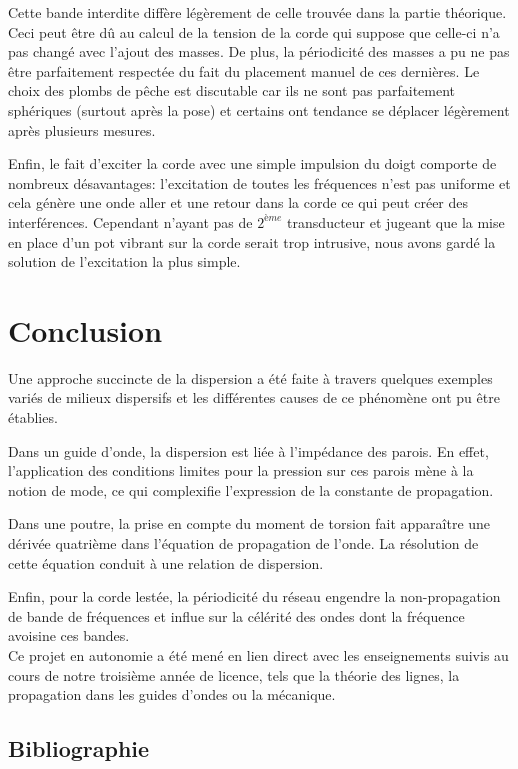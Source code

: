 \documentclass[a4paper,11pt]{report} %
\begin{document}
Cette bande interdite diffère légèrement de celle trouvée dans la partie théorique. Ceci peut être dû au calcul de la tension de la corde qui suppose que celle-ci n'a pas changé avec l'ajout des masses. De plus, la périodicité des masses a pu ne pas être parfaitement respectée du fait du placement manuel de ces dernières. Le choix des plombs de pêche est discutable car ils ne sont pas parfaitement sphériques (surtout après la pose) et certains ont tendance se déplacer légèrement après plusieurs mesures.

\bigskip
Enfin, le fait d'exciter la corde avec une simple impulsion du doigt comporte de nombreux désavantages: l'excitation de toutes les fréquences n'est pas uniforme et cela génère une onde aller et une retour dans la corde ce qui peut créer des interférences. Cependant n'ayant pas de $2^{ème}$ transducteur et jugeant que la mise en place d'un pot vibrant sur la corde serait trop intrusive, nous avons gardé la solution de l'excitation la plus simple.

\chapter*{Conclusion}

Une approche succincte de la dispersion a été faite à travers quelques exemples variés de milieux dispersifs et les différentes causes de ce phénomène ont pu être établies. 


Dans un guide d'onde, la dispersion est liée à l'impédance des parois. En effet, l'application des conditions limites pour la pression sur ces parois mène à la notion de mode, ce qui complexifie l'expression de la constante de propagation.


Dans une poutre, la prise en compte du moment de torsion fait apparaître une dérivée quatrième dans l'équation de propagation de l'onde. La résolution de cette équation conduit à une relation de dispersion.


Enfin, pour la corde lestée, la périodicité du réseau engendre la non-propagation de bande de fréquences et influe sur la célérité des ondes dont la fréquence avoisine ces bandes.
\\

Ce projet en autonomie a été mené en lien direct avec les enseignements suivis au cours de notre troisième année de licence, tels que la théorie des lignes, la propagation dans les guides d'ondes ou la mécanique.
\bigskip

\section*{Bibliographie}
\end{document}
